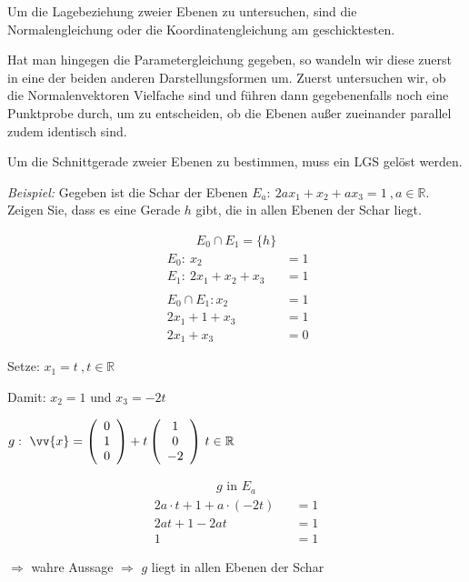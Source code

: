 Um die Lagebeziehung zweier Ebenen zu untersuchen, sind die Normalengleichung oder die Koordinatengleichung am geschicktesten.

Hat man hingegen die Parametergleichung gegeben, so wandeln wir diese zuerst in eine der beiden anderen Darstellungsformen um. Zuerst untersuchen wir, ob die Normalenvektoren Vielfache sind und führen dann gegebenenfalls noch eine Punktprobe durch, um zu entscheiden, ob die Ebenen außer zueinander parallel zudem identisch sind.

Um die Schnittgerade zweier Ebenen zu bestimmen, muss ein LGS gelöst werden.

\textit{Beispiel:} Gegeben ist die Schar der Ebenen $E_a: \ 2ax_1 + x_2 + ax_3 = 1 \ , a \in \mathbb{R}$. Zeigen Sie, dass es eine Gerade $h$ gibt, die in allen Ebenen der Schar liegt.

\begin{align}
    E_0 \cap E_1 = \{h\} \tag{1} 
\end{align}
\begin{align*}
    &E_0: \ x_2 && = 1 & \\
    &E_1: \ 2x_1  +  x_2  +   x_3  && = 1 & \\
    \ \\
    & E_0 \cap E_1 : x_2 && = 1 \\   
    &2x_1 + 1  +x_3 && = 1  \\
    &2x_1 +x_3 && = 0 
\end{align*}

Setze: $x_1 = t \ ,t \in \mathbb{R}$

Damit: $x_2 = 1$ und $x_3 = -2t$

$g: \ \vv{x} = \left(\begin{array}{c}  0 \\1 \\ 0 \end{array}\right) + t \left(\begin{array}{c}  1 \\ 0 \\ -2 \end{array}\right) \, t \in \mathbb{R}$

\begin{align}
    g \text{ in } E_a \tag{2}
\end{align}
\begin{align*}
    & 2a\cdot t + 1 + a\cdot (-2t) && = 1 &\\
    & 2at + 1 -2at && = 1 &\\
    & 1 && = 1 &
\end{align*}

$\Rightarrow$ wahre Aussage $\Rightarrow$ $g$ liegt in allen Ebenen der Schar